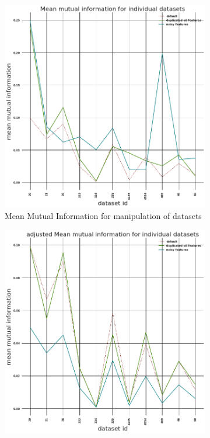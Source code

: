 \documentclass[a4paper,10pt]{article}
\begin{document}
\begin{figure}[H]
	\centering
	\begin{subfigure}[b]{0.45\textwidth}
		\includegraphics[width=\textwidth]{images/MeanMutualInformation.png}
		\caption{Mean Mutual Information for manipulation of datasets}
		\label{fig:MMI}
	\end{subfigure}
	\begin{subfigure}[b]{0.45\textwidth}
		\includegraphics[width=\textwidth]{images/adjustedMeanMutualInformation.png}

\end{subfigure}
\end{figure}
\end{document}
